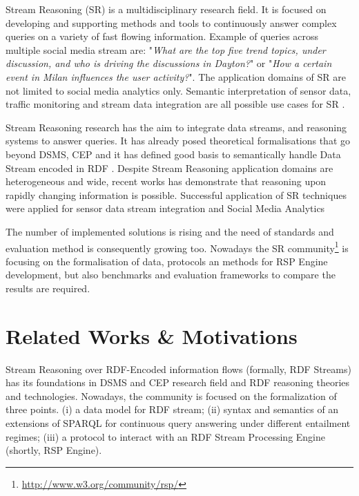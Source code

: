Stream Reasoning (SR) is a multidisciplinary research field. It is focused on developing and supporting methods and tools to continuously answer complex queries on a variety of fast flowing information. Example of queries across multiple social media stream are: "\textit{What are the top five trend topics, under discussion, and who is driving the discussions in Dayton?}" or "\textit{How a certain event in Milan influences the user activity?}". The application domains of SR are not limited to social media analytics only. Semantic interpretation of sensor data, traffic monitoring and stream data integration are all possible use cases for SR \cite{DBLP:journals/expert/ValleCHF09}.

Stream Reasoning research has the aim to integrate data streams, and reasoning systems to answer queries. It has already posed theoretical formalisations that go beyond DSMS, CEP  \cite{DBLP:conf/debs/KomazecCF12, Lephuoc2011, 4618773} and it has defined good basis to semantically handle Data Stream encoded in RDF \cite{DBLP:conf/fis/ValleCBBC08, DBLP:journals/sigmod/BarbieriBCVG10}. Despite Stream Reasoning application domains are heterogeneous and wide, recent works has demonstrate that reasoning upon rapidly changing information is possible. Successful application of SR techniques were applied for sensor data stream integration \cite{DBLP:journals/ijswis/CalbimonteJCA12,DBLP:journals/ws/LecueTHTBST14} and Social Media Analytics \cite{DBLP:journals/ws/BalduiniCDVHLKT12}

The number of implemented solutions is rising and the need of standards and evaluation method is consequently growing too. Nowadays the SR community\footnote{\url{http://www.w3.org/community/rsp/}} is focusing on the formalisation of data, protocols an methods for RSP Engine development, but also benchmarks and evaluation frameworks to compare the results are required.


\section{Related Works \& Motivations}\label{sec:motivations-intro}

Stream Reasoning over RDF-Encoded information flows (formally, RDF Streams) has its foundations in DSMS and CEP research field and RDF reasoning theories and technologies. Nowadays, the community is focused on the formalization of three points.  (i) a data model for RDF stream; (ii) syntax and semantics of an extensions of SPARQL for continuous query answering under different entailment regimes; (iii) a protocol to interact with an RDF Stream Processing Engine (shortly, RSP Engine). 

